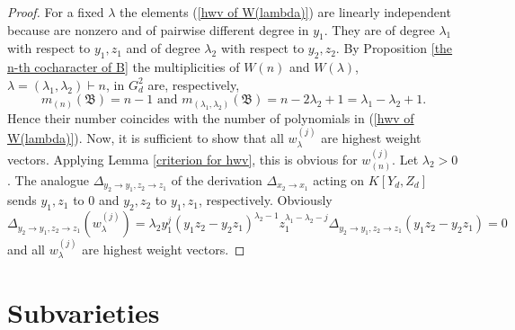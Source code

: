 \documentclass{amsart}[12pt]
\theoremstyle{definition}
\begin{document}
\begin{proof}
For a fixed $\lambda$ the elements (\ref{hwv of W(lambda)}) are linearly independent because are nonzero and of pairwise different degree in $y_1$.
They are of degree $\lambda_1$ with respect to $y_1,z_1$ and of degree $\lambda_2$ with respect to $y_2,z_2$.
By Proposition \ref{the n-th cocharacter of B} the multiplicities of $W(n)$ and
$W(\lambda)$, $\lambda=(\lambda_1,\lambda_2)\vdash n$, in $G_d^2$
are, respectively,
\[
m_{(n)}({\mathfrak B})=n-1\text{ and }m_{(\lambda_1,\lambda_2)}({\mathfrak B})=n-2\lambda_2+1=\lambda_1-\lambda_2+1.
\]
Hence their number coincides with the number of polynomials in (\ref{hwv of W(lambda)}).
Now, it is sufficient to show that all $w_{\lambda}^{(j)}$ are highest weight vectors. Applying Lemma \ref{criterion for hwv},
this is obvious for $w_{(n)}^{(j)}$. Let $\lambda_2>0$. The analogue $\Delta_{y_2\to y_1,z_2\to z_1}$ of the derivation $\Delta_{x_2\to x_1}$ acting on $K[Y_d,Z_d]$
sends $y_1,z_1$ to 0 and $y_2,z_2$ to $y_1,z_1$, respectively.
Obviously
\[
\Delta_{y_2\to y_1,z_2\to z_1}(w_{\lambda}^{(j)})
=\lambda_2y_1^j(y_1z_2-y_2z_1)^{\lambda_2-1}z_1^{\lambda_1-\lambda_2-j}\Delta_{y_2\to y_1,z_2\to z_1}(y_1z_2-y_2z_1)=0
\]
and all $w_{\lambda}^{(j)}$ are highest weight vectors.
\end{proof}

\section{Subvarieties}
\end{document}
